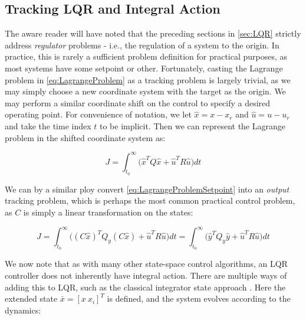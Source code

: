 \subsection{Tracking LQR and Integral Action}\label{subsec:TrackingAndIntegralAction}

The aware reader will have noted that the preceding sections in \cref{sec:LQR} strictly address \textit{regulator} problems - i.e., the regulation of a system to the origin. In practice, this is rarely a sufficient problem definition for practical purposes, as most systems have some setpoint or other. Fortunately, casting the Lagrange problem in \cref{eq:LagrangeProblem} as a tracking problem is largely trivial, as we may simply choose a new coordinate system with the target as the origin. We may perform a similar coordinate shift on the control to specify a desired operating point. For convenience of notation, we let $\hat{x} = x-x_r$ and $\hat{u} = u-u_r$ and take the time index $t$ to be implicit. Then we can represent the Lagrange problem in the shifted coordinate system as:

\begin{equation}\label{eq:LagrangeProblemSetpoint}
	J = \int_{t_0}^{\infty} \big(\hat{x}^TQ\hat{x} + \hat{u}^TR\hat{u}\big)dt
\end{equation} 

We can by a similar ploy convert \cref{eq:LagrangeProblemSetpoint} into an \textit{output} tracking problem, which is perhaps the most common practical control problem, as $C$ is simply a linear transformation on the states:

\begin{equation}\label{eq:LagrangeProblemOutput}
	J = \int_{t_0}^{\infty} \big((C\hat{x})^TQ_y(C\hat{x}) + \hat{u}^TR\hat{u}\big)dt = \int_{t_0}^{\infty} \big(\hat{y}^TQ_y\hat{y} + \hat{u}^TR\hat{u}\big)dt
\end{equation} 

We now note that as with many other state-space control algorithms, an LQR controller does not inherently have integral action. There are multiple ways of adding this to LQR, such as the classical integrator state approach \cite{Skogestad2005}. Here the extended state $\bar{x} = [x \ x_i]^T$ is defined, and the system evolves according to the dynamics:

